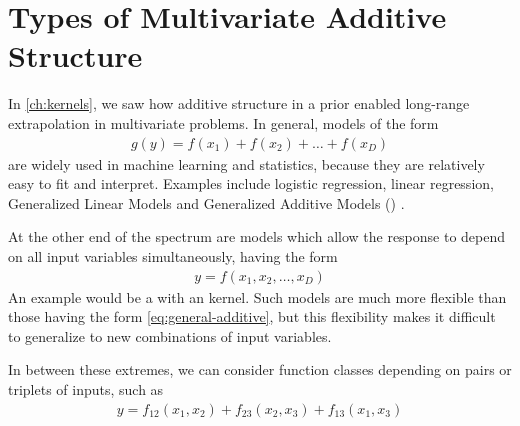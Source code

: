 \section{Types of Multivariate Additive Structure}
In \cref{ch:kernels}, we saw how additive structure in a \gp{} prior enabled long-range extrapolation in multivariate problems.
In general, models of the form
%
\begin{align}
g(y) = f(x_1) + f(x_2) + \dots + f(x_D)
\label{eq:general-additive}
\end{align}
%
are widely used in machine learning and statistics, because they are relatively easy to fit and interpret.
Examples include logistic regression, linear regression, Generalized Linear Models \citep{nelder1972generalized} and Generalized Additive Models (\GAM{}) \citep{hastie1990generalized}.

At the other end of the spectrum are models which allow the response to depend on all input variables simultaneously, having the form
%
\begin{align}
y = f(x_1, x_2, \dots, x_D)
\end{align}
%
An example would be a \gp{} with an \seard{} kernel.
Such models are much more flexible than those having the form \eqref{eq:general-additive}, but this flexibility makes it difficult to generalize to new combinations of input variables.

In between these extremes, we can consider function classes depending on pairs or triplets of inputs, such as
%
\begin{align}
y = f_{12}(x_1, x_2) + f_{23}(x_2, x_3) + f_{13}(x_1, x_3)
\label{eq:second-order-additive}
\end{align}
%






